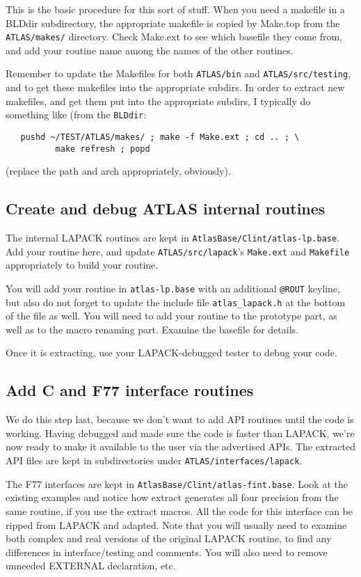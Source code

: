\documentclass[11pt]{article}
\begin{document}
This is the basic procedure for this sort of stuff. When you need a
makefile in a BLDdir subdirectory, the appropriate makefile is copied by 
Make.top from the {\tt ATLAS/makes/} directory. Check Make.ext to see which
basefile they come from, and add your routine name among the names of
the other routines.

Remember to update the Makefiles for both {\tt ATLAS/bin} and
{\tt ATLAS/src/testing}, and to get these makefiles into the appropriate
subdirs.  In order to extract new makefiles, and get them put into the
appropriate subdirs, I typically do something like (from the {\tt BLDdir}:
\begin{verbatim}
   pushd ~/TEST/ATLAS/makes/ ; make -f Make.ext ; cd .. ; \
          make refresh ; popd
\end{verbatim}
(replace the path and arch appropriately, obviously).

\subsection{Create and debug ATLAS internal routines}
The internal LAPACK routines are kept in {\tt AtlasBase/Clint/atlas-lp.base}.
Add your routine here, and update {\tt ATLAS/src/lapack}'s {\tt Make.ext}
and {\tt Makefile} appropriately to build your routine.

You will add your routine in {\tt atlas-lp.base} with an additional
{\tt @ROUT} keyline, but also do not forget to update the include
file {\tt atlas\_lapack.h} at the bottom of the file as well.  You will
need to add your routine to the prototype part, as well as to the 
macro renaming part.  Examine the basefile for details.

Once it is extracting, use your LAPACK-debugged tester to debug your code.

\subsection{Add C and F77 interface routines}
We do this step last, because we don't want to add API routines until
the code is working.  Having debugged and made sure the code is faster
than LAPACK, we're now ready to make it available to the user via the
advertised APIs.  The extracted API files are kept in subdirectories under 
{\tt ATLAS/interfaces/lapack}.

The F77 interfaces are kept in {\tt AtlasBase/Clint/atlas-fint.base}.
Look at the existing examples and
notice how extract generates all four precision from the same routine,
if you use the extract macros. All the code for this interface can be
ripped from LAPACK and adapted. Note that you will usually need to
examine both complex and real versions of the original LAPACK routine,
to find any differences in interface/testing and comments.  You will
also need to remove unneeded EXTERNAL declaration, etc.
\end{document}
